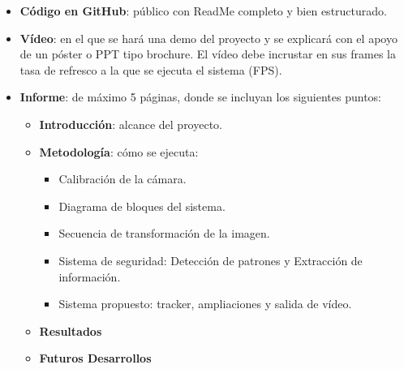 \begin{itemize}
    \item \textbf{Código en GitHub}: público con ReadMe completo y bien estructurado.
    \item \textbf{Vídeo}: en el que se hará una demo del proyecto y se explicará con el apoyo de un póster o PPT tipo brochure. El vídeo debe incrustar en sus frames la tasa de refresco a la que se ejecuta el sistema (FPS).
    \item \textbf{Informe}: de máximo 5 páginas, donde se incluyan los siguientes puntos:
    \begin{itemize}
        \item \textbf{Introducción}: alcance del proyecto.
        \item \textbf{Metodología}: cómo se ejecuta:
        \begin{itemize}
            \item Calibración de la cámara.
            \item Diagrama de bloques del sistema.
            \item Secuencia de transformación de la imagen.
            \item Sistema de seguridad: Detección de patrones y Extracción de información.
            \item Sistema propuesto: tracker, ampliaciones y salida de vídeo.
        \end{itemize}
        \item \textbf{Resultados}
        \item \textbf{Futuros Desarrollos}
    \end{itemize}
\end{itemize}